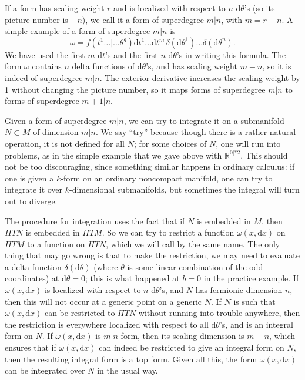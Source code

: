 \documentclass[11pt,a4paper]{article}
\def\d{{\mathrm d}}
\def\R{{\mathbb R}}
\def\Pi{\varPi}
\begin{document}
 
If a form has scaling weight $r$ and is localized with respect to $n$ $\d\theta$'s (so its picture number is $-n$), we call it a form of superdegree $m|n$, with $m=r+n$.  A simple example of a form of
superdegree $m|n$ is 
\begin{equation}\label{formtype} \omega= f(t^1\dots|\dots\theta^q) \d t^1\dots\d t^m\,\delta(\d\theta^1)\dots\delta(\d\theta^n).\end{equation}
We have used the first $m$ $\d t$'s and the first $n$ $\d\theta$'s in writing this formula.  The form $\omega$ contains $n$ delta functions of $\d\theta$'s,
and has scaling weight $m-n$, so it is indeed of superdegree $m|n$.  The exterior derivative increases the scaling weight by 1 without changing the picture number,
so it  maps forms of superdegree $m|n$ to forms of superdegree $m+1|n$.  

Given a form of superdegree $m|n$, we can try to integrate it on a submanifold $N\subset M$ of dimension $m|n$.  We say ``try'' because though there is a rather natural
operation, it is not defined for all $N$; for some choices of $N$, one will run into problems, as in the simple example that we gave above with $\R^{0|*2}$.  This should
not be too discouraging, since something similar happens
 in ordinary calculus: if one is given a $k$-form on an ordinary noncompact manifold, one can try to integrate it over $k$-dimensional submanifolds, but sometimes
 the integral will turn out to diverge.
 
 
The procedure for integration uses the fact that if $N$ is embedded in $M$, then ${\Pi} TN$ is embedded in ${\Pi} TM$.  So we can try to restrict a function $\omega(x,\d x)$
on ${\Pi} TM$ to a function on ${\Pi} TN$, which we will call by the same name. The only thing that may go wrong is that to make the restriction, we may need
to evaluate a delta function $\delta(\d\theta)$ (where $\theta$ is some linear combination of the odd coordinates) at $\d\theta=0$; this is what happened at $b=0$ in
the practice example.  
 If $\omega(x,\d x)$ is localized with respect to $n$ $\d\theta$'s, and $N$ has fermionic  dimension $n$,  then this  will not occur at a generic point on a generic $N$.
 If $N$ is such that $\omega(x,\d x)$ can be restricted to ${\Pi} TN$ without running into trouble anywhere, then the restriction is everywhere localized with respect to all
 $\d \theta$'s, and is an integral form on $N$.
 If $\omega(x,\d x)$ is $m|n$-form, then its scaling dimension is $m-n$, which ensures  that if $\omega(x,\d x)$ can indeed be restricted to give
an integral form on $N$, then the resulting integral form is a top form.   Given all this, the form $\omega(x,\d x)$ can be integrated over $N$
in the usual way.  
\end{document}
